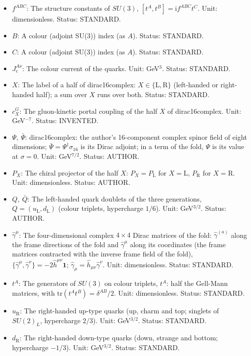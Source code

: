 \documentclass[
  10pt,
]{article}
\begin{document}
\begin{itemize}
  Unit: dimensionless. Value: \(g_3(m_Z) = 1.2177\)
  (\(\alpha_s = 0.1180\)). Status: STANDARD.
\item
  \(f^{ABC}\): The structure constants of \(SU(3)\),
  \([t^A, t^B] = \mathrm{i}f^{ABC}t^C\). Unit: dimensionless. Status:
  STANDARD.
\item
  \(B\): A colour (adjoint SU(3)) index (as \(A\)). Status: STANDARD.
\item
  \(C\): A colour (adjoint SU(3)) index (as \(A\)). Status: STANDARD.
\item
  \(J_{\mathrm{c}}^{A\nu}\): The colour current of the quarks. Unit:
  GeV\(^3\). Status: STANDARD.
\item
  \(X\): The label of a half of dirac16complex:
  \(X \in \{\mathrm{L}, \mathrm{R}\}\) (left-handed or right-handed
  half); a sum over \(X\) runs over both. Status: STANDARD.
\item
  \(c^{G}_X\): The gluon-kinetic portal coupling of the half \(X\) of
  dirac16complex. Unit: GeV\(^{-7}\). Status: INVENTED.
\item
  \(\Psi,\ \bar\Psi\): dirac16complex: the author's 16-component complex
  spinor field of eight dimensions;
  \(\bar\Psi = \Psi^\dagger\sigma_{16}\) is its Dirac adjoint; in a term
  of the fold, \(\Psi\) is its value at \(\sigma = 0\). Unit:
  GeV\(^{7/2}\). Status: AUTHOR.
\item
  \(P_X\): The chiral projector of the half \(X\):
  \(P_X = P_{\mathrm{L}}\) for \(X = \mathrm{L}\), \(P_{\mathrm{R}}\)
  for \(X = \mathrm{R}\). Unit: dimensionless. Status: AUTHOR.
\item
  \(Q,\ \bar Q\): The left-handed quark doublets of the three
  generations, \(Q = (u_{\mathrm{L}}, d_{\mathrm{L}})\) (colour
  triplets, hypercharge \(1/6\)). Unit: GeV\(^{3/2}\). Status: AUTHOR.
\item
  \(\hat\gamma^\mu\): The four-dimensional complex \(4 \times 4\) Dirac
  matrices of the fold: \(\hat\gamma^{(a)}\) along the frame directions
  of the fold and \(\hat\gamma^\mu\) along its coordinates (the frame
  matrices contracted with the inverse frame field of the fold),
  \(\{\hat\gamma^\mu, \hat\gamma^\nu\} = -2\hat h^{\mu\nu}\mathbf{1}\);
  \(\hat\gamma_\mu = \hat h_{\mu\nu}\hat\gamma^\nu\). Unit:
  dimensionless. Status: STANDARD.
\item
  \(t^A\): The generators of \(SU(3)\) on colour triplets, \(t^A\): half
  the Gell-Mann matrices, with \(\mathrm{tr}(t^At^B) = \delta^{AB}/2\).
  Unit: dimensionless. Status: STANDARD.
\item
  \(u_{\mathrm{R}}\): The right-handed up-type quarks (up, charm and
  top; singlets of \(SU(2)_L\), hypercharge \(2/3\)). Unit:
  GeV\(^{3/2}\). Status: STANDARD.
\item
  \(d_{\mathrm{R}}\): The right-handed down-type quarks (down, strange
  and bottom; hypercharge \(-1/3\)). Unit: GeV\(^{3/2}\). Status:
  STANDARD.
\end{itemize}
\end{document}
